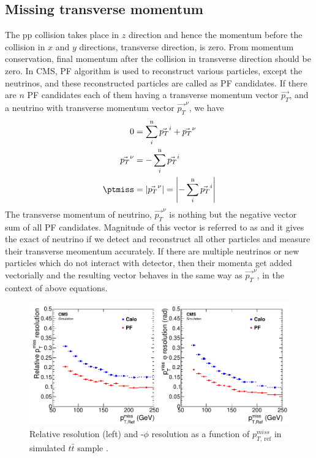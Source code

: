 \subsection{Missing transverse momentum}
The pp collision takes place in $z$ direction and hence the momentum before the collision in $x$ and $y$ directions, transverse direction, 
is zero. From momentum conservation, final momentum after the collision in transverse direction should be zero. In CMS, PF algorithm is 
used to reconstruct various particles, except the neutrinos, and these reconstructed particles are called as PF candidates. If there are 
$n$ PF candidates each of them having a transverse momentum vector $\vec{p_{T}}$, and a neutrino with transverse momentum 
vector $\vec{p_{T}}^{\nu}$, we have
\begin{align}
0 &= \sum_{i}^{\mathrm{n}}\vec{p_{T}}^{i} + \vec{p_{T}}^{\nu} \\
\vec{p_{T}}^{\nu} &= - \sum_{i}^{\mathrm{n}}\vec{p_{T}}^{i}\\
\ptmiss &= |\vec{p_{T}}^{\nu}| = \left|- \sum_{i}^{\mathrm{n}}\vec{p_{T}}^{i}\right|
\end{align}
The transverse momentum of neutrino, $\vec{p_{T}}^{\nu}$ is nothing but the negative vector sum of all PF candidates. Magnitude of this 
vector is referred to as \ptmiss and it gives the exact \pt of neutrino if we detect and reconstruct all other particles and measure their 
transverse meomentum accurately. If there are multiple neutrinos or new particles which do not interact with detector, then their momenta 
get added vectorially and the resulting vector behaves in the same way as $\vec{p_{T}}^{\nu}$, in the context of above equations.
\begin{figure}[h!]
\centering
\includegraphics[width=0.9\linewidth]{../Figures/Chap2/METresoln}
\caption[\ptmiss resolution]{Relative \ptmiss resolution (left) and \ptmiss-$\phi$ resolution as a function of $p_{T,\ \mathrm{ref}}^{miss}$ in simulated $t\bar{t}$ sample \cite{CMS-PRF-14-001}.}
\label{fig:METresoln}
\end{figure}

